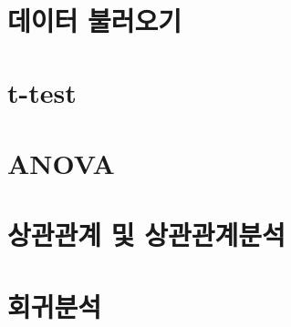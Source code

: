 

\chapter{데이터 불러오기}


\chapter{t-test}


\chapter{ANOVA}


\chapter{상관관계 및 상관관계분석}


\chapter{회귀분석}

